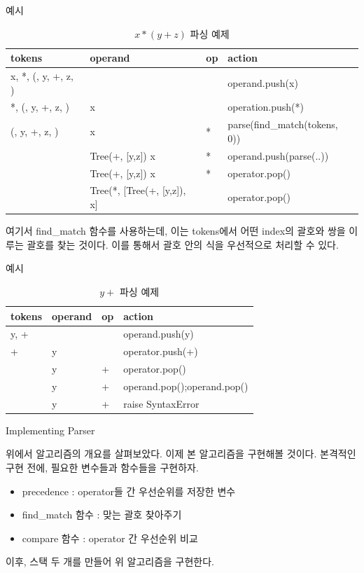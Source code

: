 \documentclass{beamer}
\begin{document}
\begin{frame}{예시}

\begin{table}[]
\centering
\caption{$x*(y+z)$ 파싱 예제}
\label{my-label}
\begin{tabular}{|l|l|l|l|}
\hline
tokens & operand  & op  & action \\ \hline
x, *, (,  y, +, z, )&     &  & operand.push(x)     \\ \hline
*, (,  y, +, z, )&  x  &  & operation.push(*)     \\ \hline
(,  y, +, z, )&  x  & * & parse(find\_match(tokens, 0))     \\ \hline
 &  Tree(+, [y,z]) x  & * & operand.push(parse(..))     \\ \hline
 &  Tree(+, [y,z]) x  & * & operator.pop()     \\ \hline
 &  Tree(*, [Tree(+, [y,z]), x]  &  & operator.pop()     \\ \hline
\end{tabular}
\end{table}

여기서 find\_match 함수를 사용하는데, 이는 tokens에서 어떤 index의 괄호와 쌍을 이루는 괄호를 찾는 것이다. 이를 통해서 괄호 안의 식을 우선적으로 처리할 수 있다. 

\end{frame}


\begin{frame}{예시}

\begin{table}[]
\centering
\caption{$y+$ 파싱 예제}
\label{my-label}
\begin{tabular}{|l|l|l|l|}
\hline
tokens & operand  & op  & action \\ \hline
y, + &     &  & operand.push(y)     \\ \hline
 + &  y   &  & operator.push(+)     \\ \hline
 &  y   & + & operator.pop()     \\ \hline
 &  y   & + & operand.pop();operand.pop()     \\ \hline
 &  y   & + & raise SyntaxError     \\ \hline
\end{tabular}
\end{table}

\end{frame}


\begin{frame}{Implementing Parser} 

위에서 알고리즘의 개요를 살펴보았다. 이제 본 알고리즘을 구현해볼 것이다. 본격적인 구현 전에, 필요한 변수들과 함수들을 구현하자. 
\begin{itemize} 
\item precedence : operator들 간 우선순위를 저장한 변수
\item find\_match 함수 : 맞는 괄호 찾아주기 
\item compare 함수 : operator 간 우선순위 비교
\end{itemize}

이후, 스택 두 개를 만들어 위 알고리즘을 구현한다. 
\end{frame}
\end{document}
